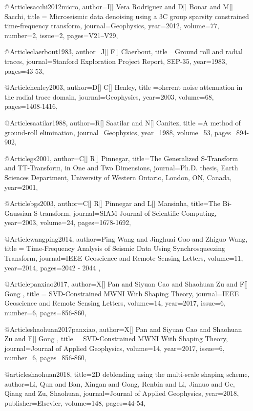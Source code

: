 {@Article{sacchi2012micro,
  author={I[] Vera Rodriguez and D[] Bonar and M[] Sacchi},
  title = {Microseismic data denoising using a 3C group sparsity constrained time-frequency transform},
  journal={Geophysics},
  year=2012,
volume=77,
number=2,
issue=2,
  pages={V21–V29},
}

@Article{claerbout1983,
  author={J[] F[] Claerbout},
  title ={Ground roll and radial traces},
  journal={Stanford Exploration Project Report, SEP-35},
  year=1983,
  pages={43-53},
}

@Article{henley2003,
  author={D[] C[] Henley},
  title ={oherent noise attenuation in the radial trace domain},
  journal={Geophysics},
  year=2003,
  volume=68,
  pages={1408-1416},
}

@Article{saatilar1988,
  author={R[] Saatilar and N[] Canitez},
  title ={A method of ground-roll elimination},
  journal={Geophysics},
  year=1988,
  volume=53,
  pages={894-902},
}

@Article{gs2001,
  author={C[] R[] Pinnegar},
  title={The Generalized S-Transform and TT-Transform, in One and Two Dimensions},
  journal={Ph.D. thesis, Earth Sciences Department, University of Western Ontario, London,
ON, Canada},
  year=2001,
}

@Article{bgs2003,
  author={C[] R[] Pinnegar and L[] Mansinha},
  title={The {B}i-{G}aussian {S}-transform},
  journal={SIAM Journal of Scientific Computing},
  year=2003,
  volume=24,
  pages={1678-1692},
}

@Article{wangping2014,
  author={Ping Wang and Jinghuai Gao and Zhiguo Wang},
  title = {Time-Frequency Analysis of Seismic Data Using Synchrosqueezing Transform},
  journal={IEEE Geoscience and Remote Sensing Letters},
  volume={11},
  year=2014,
  pages={2042 - 2044 },
}

@Article{panxiao2017,
  author={X[] Pan and Siyuan Cao and Shaohuan Zu and F[] Gong },
  title = {SVD-Constrained MWNI With Shaping Theory},
  journal={IEEE Geoscience and Remote Sensing Letters},
  volume={14},
  year=2017,
  issue=6,
  number=6,
  pages={856-860},
}

@Article{shaohuan2017panxiao,
  author={X[] Pan and Siyuan Cao and Shaohuan Zu and F[] Gong },
  title = {SVD-Constrained MWNI With Shaping Theory},
  journal={Journal of Applied Geophysics},
  volume={14},
  year=2017,
  issue=6,
  number=6,
  pages={856-860},
}

@article{shaohuan2018,
  title={2{D} deblending using the multi-scale shaping scheme},
  author={Li, Qun and Ban, Xingan and Gong, Renbin and Li, Jinnuo and Ge, Qiang and Zu, Shaohuan},
  journal={Journal of Applied Geophysics},
  year={2018},
  publisher={Elsevier},
 volume={148},
  pages={44-54},
}

}
